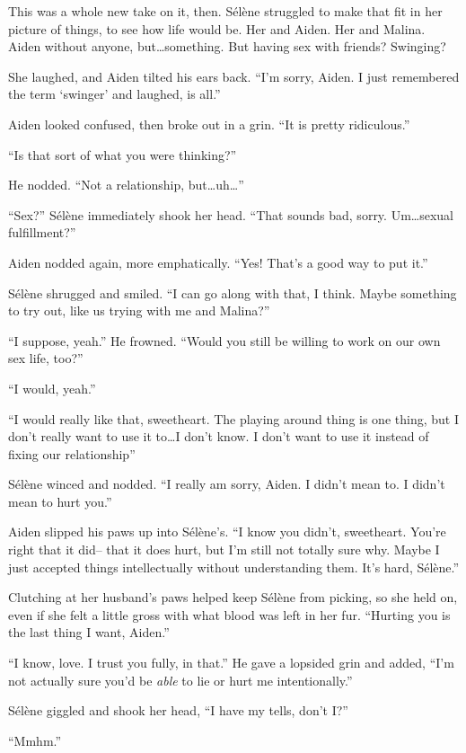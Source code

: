 This was a whole new take on it, then. Sélène struggled to make that fit in her picture of things, to see how life would be. Her and Aiden. Her and Malina. Aiden without anyone, but\ldots{}something. But having sex with friends? Swinging?

She laughed, and Aiden tilted his ears back. ``I'm sorry, Aiden. I just remembered the term `swinger' and laughed, is all.''

Aiden looked confused, then broke out in a grin. ``It is pretty ridiculous.''

``Is that sort of what you were thinking?''

He nodded. ``Not a relationship, but\ldots{}uh\ldots{}''

``Sex?'' Sélène immediately shook her head. ``That sounds bad, sorry. Um\ldots{}sexual fulfillment?''

Aiden nodded again, more emphatically. ``Yes! That's a good way to put it.''

Sélène shrugged and smiled. ``I can go along with that, I think. Maybe something to try out, like us trying with me and Malina?''

``I suppose, yeah.'' He frowned. ``Would you still be willing to work on our own sex life, too?''

``I would, yeah.''

``I would really like that, sweetheart. The playing around thing is one thing, but I don't really want to use it to\ldots{}I don't know. I don't want to use it instead of fixing our relationship''

Sélène winced and nodded. ``I really am sorry, Aiden. I didn't mean to. I didn't mean to hurt you.''

Aiden slipped his paws up into Sélène's. ``I know you didn't, sweetheart. You're right that it did-- that it does hurt, but I'm still not totally sure why. Maybe I just accepted things intellectually without understanding them. It's hard, Sélène.''

Clutching at her husband's paws helped keep Sélène from picking, so she held on, even if she felt a little gross with what blood was left in her fur. ``Hurting you is the last thing I want, Aiden.''

``I know, love. I trust you fully, in that.'' He gave a lopsided grin and added, ``I'm not actually sure you'd be \emph{able} to lie or hurt me intentionally.''

Sélène giggled and shook her head, ``I have my tells, don't I?''

``Mmhm.''

